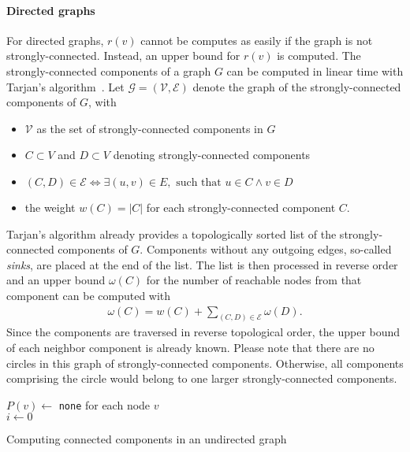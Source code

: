 \paragraph{Directed graphs}
 For directed graphs, $r(v)$ cannot be computes as easily if the graph is not strongly-connected. Instead, an upper bound for $r(v)$ is computed. The strongly-connected components of a graph $G$ can be computed in linear time with Tarjan's algorithm~\cite{tarjan1972depth}. Let $\mathcal{G = (V, E)}$ denote the graph of the strongly-connected components of $G$, with
 
 \begin{itemize}
 	\item $\mathcal{V}$ as the set of strongly-connected components in $G$
 	\item $C \subset V$ and $D \subset V$ denoting strongly-connected components
 	\item $(C, D) \in \mathcal{E} \iff \exists (u, v) \in E, \text{ such that } u \in C \land v \in D$ 
 	\item the weight $w(C) = |C|$ for each strongly-connected component $C$.
 \end{itemize}
 
 Tarjan's algorithm already provides a topologically sorted list of the strongly-connected components of $G$. Components without any outgoing edges, so-called \emph{sinks}, are placed at the end of the list. The list is then processed in reverse order and an upper bound $\omega(C)$ for the number of reachable nodes from that component can be computed with 
 \begin{align*}
 	\omega(C) = w(C) + \sum_{(C, D) \in \mathcal{E}}{\omega(D)}.
 \end{align*}
Since the components are traversed in reverse topological order, the upper bound of each neighbor component is already known. Please note that there are no circles in this graph of strongly-connected components. Otherwise, all components comprising the circle would belong to one larger strongly-connected components.

\begin{algorithm2e}[h!]
 \label{alg:connectedComponents}
 $P(v) \gets$ \texttt{none} for each node $v$ \\
 $i \gets 0$ \\
 
 
 
 \caption{Computing connected components in an undirected graph}
\end{algorithm2e}

